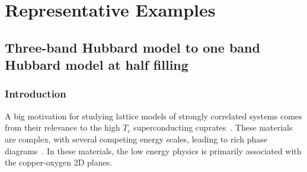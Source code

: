 \documentclass[prl,12pt,onecolumn,nofootinbib,notitlepage,english,superscriptaddress]{revtex4-1}
\newcommand{\HJC}[1]{{\color{RED}{\bf HJC: #1}}}
\begin{document}

\section{Representative Examples}
\subsection{Three-band Hubbard model to one band Hubbard model at half filling}
\subsubsection{Introduction}
A big motivation for studying lattice models of strongly correlated systems comes from their 
relevance to the high $T_c$ superconducting cuprates~\cite{Bednorz1986}. These materials are complex, with several 
competing energy scales, leading to rich phase diagrams~\cite{Dagotto_RevModPhys, LeeWen_RevModPhys}. In these materials, 
the low energy physics is primarily associated with the copper-oxygen 2D planes. 
\end{document}
